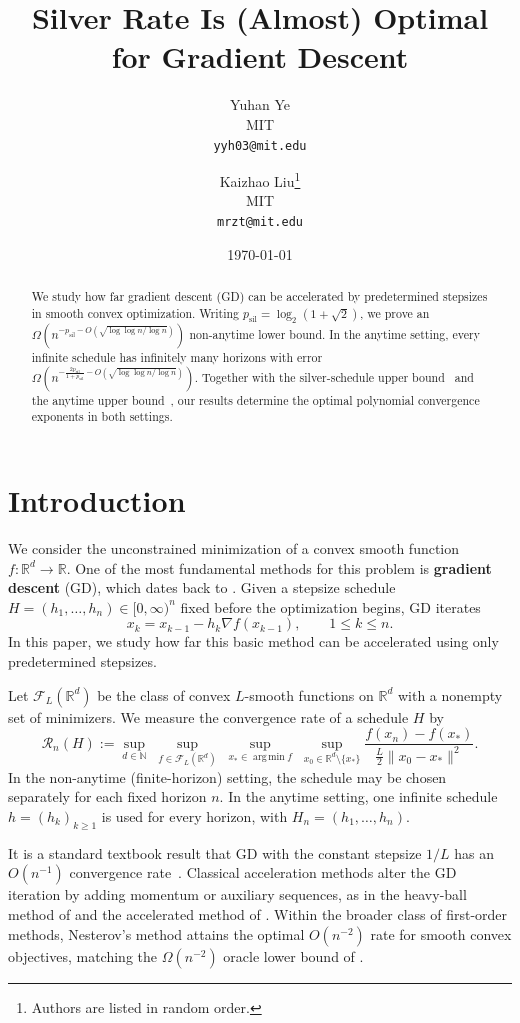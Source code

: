 \documentclass[11pt,letterpaper]{article}
\title{Silver Rate Is (Almost) Optimal for Gradient Descent}
\author{Yuhan Ye\footnotemark[1]\\MIT\\\texttt{yyh03@mit.edu}
  \and Kaizhao Liu\thanks{Authors are listed in random order.}\\MIT\\\texttt{mrzt@mit.edu}}
\date{\today}
\theoremstyle{definition}
\newcommand{\R}{\mathbb R}
\newcommand{\N}{\mathbb N}
\newcommand{\psil}{p_{\mathrm{sil}}}
\DeclareMathOperator*{\argminop}{arg\,min}
\begin{document}
\maketitle
\begin{abstract}
We study how far gradient descent (GD) can be accelerated by predetermined stepsizes in smooth convex optimization.
Writing $\psil=\log_2(1+\sqrt2)$, we prove an $\Omega\!\left(n^{-\psil-O(\sqrt{\log\log n/\log n})}\right)$ non-anytime lower bound.
In the anytime setting, every infinite schedule has infinitely many horizons with error $\Omega\!\left(n^{-\frac{2\psil}{1+\psil}-O(\sqrt{\log\log n/\log n})}\right)$.
Together with the silver-schedule upper bound~\citep{AltschulerParrilo2025} and the anytime upper bound~\citep{ZhangLeeDuChen2025}, our results determine the optimal polynomial convergence exponents in both settings.
\end{abstract}

\clearpage
\tableofcontents
\clearpage

\section{Introduction}
\label{sec:introduction}

We consider the unconstrained minimization of a convex smooth function $f:\R^d\to\R$.
One of the most fundamental methods for this problem is \textbf{gradient descent} (GD), which dates back to \citet{Cauchy1847}.
Given a stepsize schedule $H=(h_1,\ldots,h_n)\in[0,\infty)^n$ fixed before the optimization begins, GD iterates
\[
  x_k=x_{k-1}-h_k\nabla f(x_{k-1}),\qquad 1\le k\le n.
\]
In this paper, we study how far this basic method can be accelerated using only predetermined stepsizes.

Let $\mathcal F_L(\R^d)$ be the class of convex $L$-smooth functions on $\R^d$ with a nonempty set of minimizers.
We measure the convergence rate of a schedule $H$ by
\begin{equation}
  \mathcal R_n(H):=
  \sup_{d\in\N}\;
  \sup_{f\in\mathcal F_L(\R^d)}\;
  \sup_{x_*\in\argminop f}\;
  \sup_{x_0\in\R^d\setminus\{x_*\}}
  \frac{f(x_n)-f(x_*)}{\frac{L}{2}\lVert x_0-x_*\rVert^2}.
  \label{eq:worst-case-error}
\end{equation}
In the non-anytime (finite-horizon) setting, the schedule may be chosen separately for each fixed horizon $n$.
In the anytime setting, one infinite schedule $h=(h_k)_{k\ge1}$ is used for every horizon, with $H_n=(h_1,\ldots,h_n)$.

It is a standard textbook result that GD with the constant stepsize $1/L$ has an $O(n^{-1})$ convergence rate~\citep{LevitinPolyak1966,Nesterov2004}.
Classical acceleration methods alter the GD iteration by adding momentum or auxiliary sequences, as in the heavy-ball method of \citet{Polyak1964} and the accelerated method of \citet{Nesterov1983}.
Within the broader class of first-order methods, Nesterov's method attains the optimal $O(n^{-2})$ rate for smooth convex objectives, matching the $\Omega(n^{-2})$ oracle lower bound of \citet{NemirovskyYudin1983}.
\end{document}
